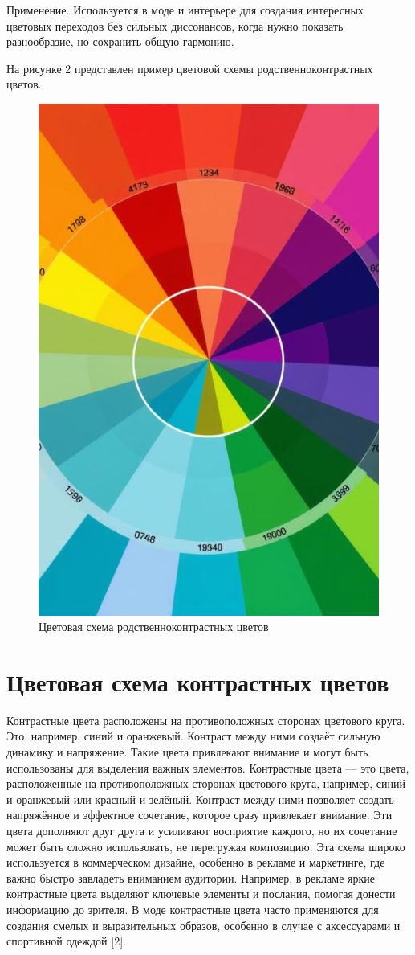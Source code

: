 \documentclass[bachelor, och, referat]{SCWorks}
\begin{document}
Применение. Используется в моде и интерьере для создания интересных цветовых переходов без сильных диссонансов, когда нужно показать разнообразие, но сохранить общую гармонию.

На рисунке 2 представлен пример цветовой схемы родственноконтрастных цветов.
\begin{figure}
        \includegraphics[width=0.6\linewidth]{related_contrast_example.png} 
        \caption{Цветовая схема родственноконтрастных цветов}
 \end{figure}

\section{Цветовая схема контрастных цветов}
Контрастные цвета расположены на противоположных сторонах цветового круга. Это, например, синий и оранжевый. Контраст между ними создаёт сильную динамику и напряжение. Такие цвета привлекают внимание и могут быть использованы для выделения важных элементов.
Контрастные цвета — это цвета, расположенные на противоположных сторонах цветового круга, например, синий и оранжевый или красный и зелёный. Контраст между ними позволяет создать напряжённое и эффектное сочетание, которое сразу привлекает внимание. Эти цвета дополняют друг друга и усиливают восприятие каждого, но их сочетание может быть сложно использовать, не перегружая композицию.
Эта схема широко используется в коммерческом дизайне, особенно в рекламе и маркетинге, где важно быстро завладеть вниманием аудитории. Например, в рекламе яркие контрастные цвета выделяют ключевые элементы и послания, помогая донести информацию до зрителя. В моде контрастные цвета часто применяются для создания смелых и выразительных образов, особенно в случае с аксессуарами и спортивной одеждой [2].
\end{document}
